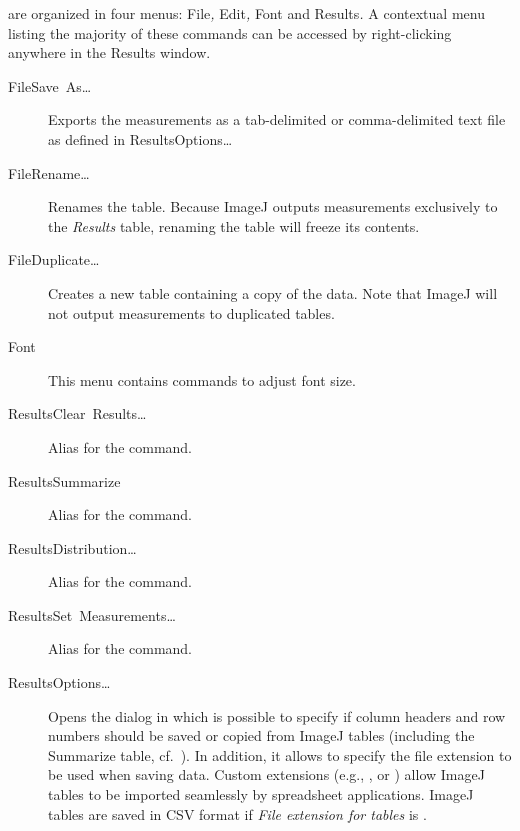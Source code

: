  are organized in four menus:\textsf{\emph{\small{}
}}\textsf{\small File}\lyxarrow{}\emph{, }\textsf{\small Edit}\lyxarrow{}\emph{,
}\textsf{\small Font}\lyxarrow{}\emph{ }and\emph{ }\textsf{\small Results}\lyxarrow{}\emph{.
}A contextual menu listing the majority of these commands can be accessed
by right-clicking anywhere in the Results window.
\begin{description}
\item [{\textsf{\small File}\emph{\lyxarrow{}}\textsf{\small Save\ As\ldots{}}}] Exports
the measurements as a tab-delimited or comma-delimited text file as
defined in \textsf{\small Results}\emph{\lyxarrow{}}\textsf{\small Options\ldots{}}{\small \par}
\item [{\textsf{\small File}\emph{\lyxarrow{}}\textsf{\small Rename\ldots{}}}] Renames
the table. Because ImageJ outputs measurements exclusively to the
\emph{Results} table, renaming the table will freeze its contents.
\item [{\textsf{\small File}\emph{\lyxarrow{}}\textsf{\small Duplicate\ldots{}}}] Creates
a new table containing a copy of the data. Note that ImageJ will not
output measurements to duplicated tables.
\item [{\textsf{\small Font}\emph{\lyxarrow{}}}] This menu contains commands
to adjust font size.
\item [{\textsf{\small Results}\emph{\lyxarrow{}}\textsf{\small Clear\ Results\ldots{}}}] Alias
for the 
command.
\item [{\textsf{\small Results}\emph{\lyxarrow{}}\textsf{\small Summarize}}] Alias
for the 
command.
\item [{\textsf{\small Results}\emph{\lyxarrow{}}\textsf{\small Distribution\ldots{}}}] Alias
for the 
command.
\item [{\textsf{\small Results}\emph{\lyxarrow{}}\textsf{\small Set\ Measurements\ldots{}}}] Alias
for the 
command.
\item [{\textsf{\small Results}\emph{\lyxarrow{}}\textsf{\small Options\ldots{}}}] Opens
the 
dialog in which is possible to specify if column headers and row numbers
should be saved or copied from ImageJ tables (including the Summarize
table, cf.\ ).
In addition, it allows to specify the file extension to be used when
saving data. Custom extensions (e.g., , 
or ) allow ImageJ tables to be imported seamlessly
by spreadsheet applications. ImageJ tables are saved in CSV
format if \emph{File extension for tables} is .
\end{description}

